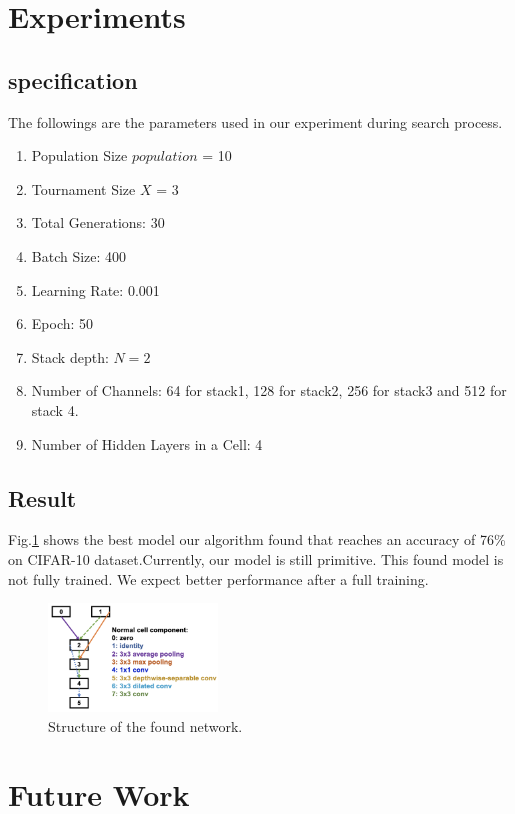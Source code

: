 \documentclass[conference]{IEEEtran}
\begin{document}
 \section{Experiments}

 \subsection{specification}
 The followings are the parameters used in our experiment during search process.
 \begin{enumerate}
  \item Population Size $population$ = 10
  \item Tournament Size $X$ = 3
  \item Total Generations: 30
  \item Batch Size: 400
  \item Learning Rate: 0.001
  \item Epoch: 50
  \item Stack depth: $N = 2$
  \item Number of Channels: 64 for stack1, 128 for stack2, 256 for stack3 and 512 for stack 4.
  \item Number of Hidden Layers in a Cell: 4
 \end{enumerate}

 \subsection{Result}

 Fig.\ref{found_artc} shows the best model our algorithm found that reaches an accuracy of 76\% on CIFAR-10 dataset.Currently, our model is still primitive. This found model is not fully trained. We expect better performance after a full training.

\begin{figure}[H]
 	\centering
 	\includegraphics[width=0.4\textwidth]{figures/newResult.png}
   \caption{Structure of the found network. }\label{fig:digit}
   \label{found_artc}
  \end{figure}

  

 \section{Future Work}  
\end{document}
